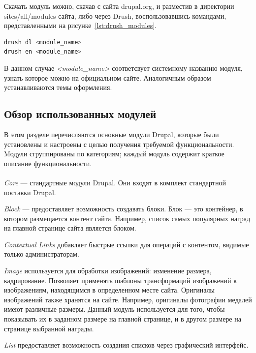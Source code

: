 Скачать модуль можно, скачав с сайта drupal.org, и разместив в директории
sites/all/modules сайта, либо через Drush, воспользовавшись командами,
представленными на рисунке~\ref{lst:drush_modules}.

\begin{lstlisting}[language=bash,
  caption=Установка модуля Drupal с использованием Drush,
  label=lst:drush_modules]
drush dl <module_name>
drush en <module_name>
\end{lstlisting}

В данном случае \textit{<module\_name>} соответсвует системному названию модуля,
узнать которое можно на официальном сайте.
Аналогичным образом устанавливаются темы оформления.

\subsection{Обзор использованных модулей}
\label{ssec:modules_overlook}

В этом разделе перечисляются основные модули Drupal,
которые были установлены и настроены с целью получения требуемой функциональности.
Mодули сгруппированы по категориям; каждый модуль содержит краткое описание функциональности.

\paragraph{}
\textit{Core} --- стандартные модули Drupal. Они входят в комплект стандартной поставки Drupal.

\textit{Block} --- предоставляет возможность создавать блоки. 
Блок --- это контейнер, в котором размещается контент сайта.
Например, список самых популярных наград на главной странице сайта является блоком.

\textit{Contextual Links} добавляет быстрые ссылки для операций с контентом,
видимые только администраторам.

\textit{Image} используется для обработки изображений: изменение размера, кадрирование.
Позволяет применять шаблоны трансформаций изображений к изображениям,
находящимся в определенном месте сайта. Оригиналы изображений также хранятся на сайте.
Например, оригиналы фотографии медалей имеют различные размеры. 
Данный модуль используется для того, чтобы показывать их в заданном размере
на главной странице, и в другом размере на странице выбранной награды.

\textit{List} предоставляет возможность создания списков через графический интерфейс.

